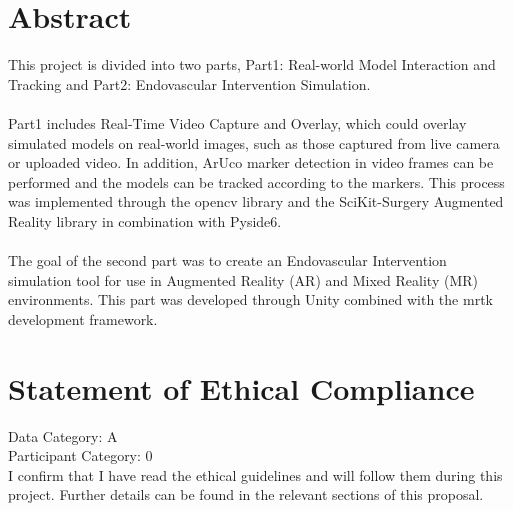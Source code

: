 \documentclass[12pt]{article}
\begin{document}
\section*{Abstract}
This project is divided into two parts, Part1: Real-world Model Interaction and Tracking and Part2: Endovascular Intervention Simulation. 
\\\\
Part1 includes Real-Time Video Capture and Overlay, which could overlay simulated models on real-world images, such as those captured from live camera or uploaded video. In addition, ArUco marker detection in video frames can be performed and the models can be tracked according to the markers. This process was implemented through the \gls{opencv} library and the SciKit-Surgery Augmented Reality\cite{Thompson_SciKit-Surgery_Compact_Libraries_2020} library in combination with Pyside6. 
\\\\
The goal of the second part was to create an Endovascular Intervention simulation tool for use in Augmented Reality (AR) and Mixed Reality (MR) environments. This part was developed through Unity combined with the \gls{mrtk} development framework.
\section*{Statement of Ethical Compliance}
\begin{mdframed}
      \Large %
      Data Category: A \\
      Participant Category: 0 \\
      \normalsize %
      I confirm that I have read the ethical guidelines and will follow them during this project. Further details can be found in the relevant sections of this proposal.
\end{mdframed}
\newpage

\end{document}
